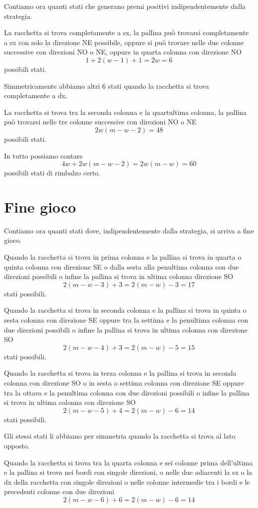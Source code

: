 \documentclass[a4paper,11pt]{article}
\begin{document}
Contiamo ora quanti stati che generano premi positivi indipendentemente dalla strategia.

La racchetta si trova completamente a sx, la pallina può trovarsi completamente a sx con solo la direzione NE possibile, oppure si può trovare nelle due colonne successive con direzioni NO o NE, oppure in quarta colonna con direzione NO
\[ 1 + 2(w-1) + 1 = 2w =  6 \]
possibili stati.

Simmetricamente abbiamo altri 6 stati quando la racchetta si trova completamente a dx.

La racchetta si trova tra la seconda colonna e la quartultima colonna, la pallina può trovarsi nelle tre colonne successive con direzioni NO o NE
\[
2w(m-w-2) = 48
\]
possibili stati.

In tutto possiamo contare 
\[
4w+2w(m-w-2) = 2w(m-w)=60
\]
possibili stati di rimbalzo certo.


\section{Fine gioco}

Contiamo ora quanti stati dove, indipendentemente dalla strategia, si arriva a fine gioco.

Quando la racchetta si trova in prima colonna e la pallina si trova in quarta o quinta colonna con direzione SE o dalla sesta alla penultima colonna con due direzioni possibili o infine la pallina si trova in ultima colonna direzione SO
\[
2(m-w-3)+3=2(m-w)-3=17
\]
stati possibili.

Quando la racchetta si trova in seconda colonna e la pallina si trova in quinta o sesta colonna con direzione SE oppure tra la settima e la penultima colonna con due direzioni possibili o infine la pallina si trova in ultima colonna con direzione SO
\[
2(m-w-4)+3 = 2(m-w)-5 = 15
\]
stati possibili.

Quando la racchetta si trova in terza colonna e la pallina si trova in seconda colonna con direzione SO o in sesta o settima colonna con direzione SE oppure tra la ottava e la penultima colonna con due direzioni possibili o infine la pallina si trova in ultima colonna con direzione SO
\[
2(m-w-5)+4= 2(m-w)-6 = 14
\]
stati possibili.

Gli stessi stati li abbiamo per simmetria quando la racchetta si trova al lato opposto.

Quando la racchetta si trova tra la quarta colonna e sei colonne prima dell'ultima e la pallina si trova nei bordi con singole direzioni, o nelle due adiacenti la sx o la dx della racchetta con singole direzioni o nelle colonne intermedie tra i bordi e le precedenti colonne con due direzioni
\[
2(m-w-6)+6 = 2(m-w)-6=14
\]
\end{document}
